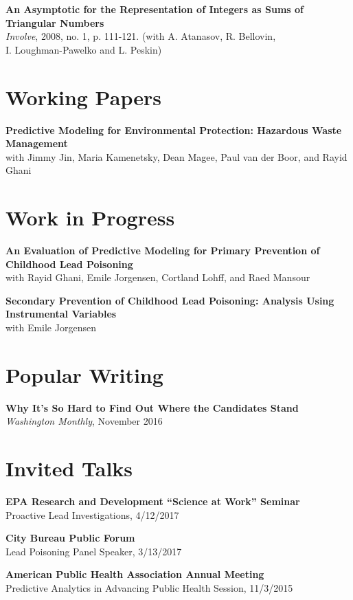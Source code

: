 \documentclass[margin,line]{resume}
\begin{document}
\begin{resume}
	{\bf An Asymptotic for the Representation of Integers as Sums of\\Triangular Numbers} \\
        \textit{Involve}, 2008, no. 1, p. 111-121. (with A. Atanasov, R. Bellovin,\\ I. Loughman-Pawelko and L. Peskin)

        \section{\mysidestyle Working Papers}
        {\bf Predictive Modeling for Environmental Protection: Hazardous Waste Management}\\
        with Jimmy Jin, Maria Kamenetsky, Dean Magee, Paul van der Boor, and Rayid Ghani

        \section{\mysidestyle Work in Progress}
        {\bf An Evaluation of Predictive Modeling for Primary Prevention of Childhood Lead Poisoning}\\
        with Rayid Ghani, Emile Jorgensen, Cortland Lohff, and Raed Mansour

        {\bf Secondary Prevention of Childhood Lead Poisoning: Analysis Using Instrumental Variables}\\
        with Emile Jorgensen
        \section{\mysidestyle Popular Writing}
        {\bf Why It's So Hard to Find Out Where the Candidates Stand} \\
        \textit{Washington Monthly}, November 2016


	\section{\mysidestyle Invited Talks}
	{\bf EPA Research and Development ``Science at Work'' Seminar} \\
        Proactive Lead Investigations, 4/12/2017

	{\bf City Bureau Public Forum} \\
        Lead Poisoning Panel Speaker, 3/13/2017 

	{\bf American Public Health Association Annual Meeting} \\
    Predictive Analytics in Advancing Public Health Session, 11/3/2015 


\end{resume}
\end{document}
